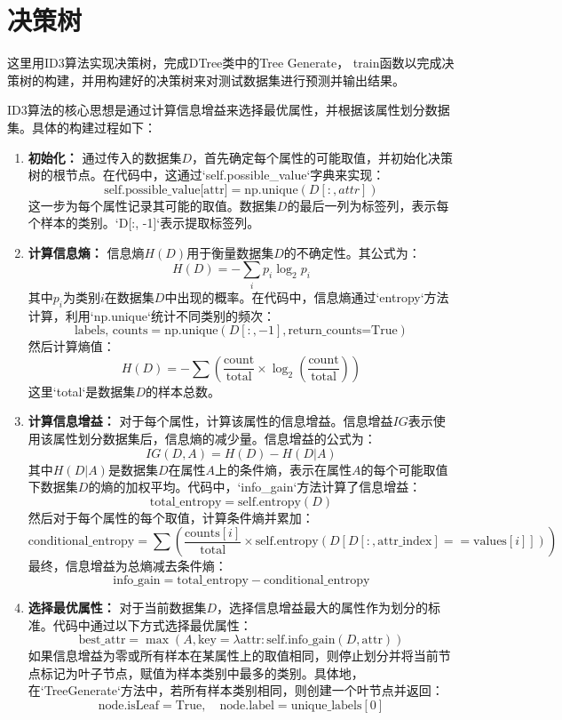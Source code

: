 \documentclass[12pt,a4paper,oneside]{article}
\begin{document}
\section{决策树}
\qquad 这里用ID3算法实现决策树，完成DTree类中的Tree Generate，
train函数以完成决策树的构建，并用构建好的决策树来对测试数据集进行预测并输出结果。



ID3算法的核心思想是通过计算信息增益来选择最优属性，并根据该属性划分数据集。具体的构建过程如下：

\begin{enumerate}
    \item \textbf{初始化：}
    通过传入的数据集$D$，首先确定每个属性的可能取值，并初始化决策树的根节点。在代码中，这通过`self.possible\_value`字典来实现：
    \[
    \text{self.possible\_value[attr]} = \text{np.unique}(D[:, attr])
    \]
    这一步为每个属性记录其可能的取值。数据集$D$的最后一列为标签列，表示每个样本的类别。`D[:, -1]`表示提取标签列。
    
    \item \textbf{计算信息熵：}
    信息熵$H(D)$用于衡量数据集$D$的不确定性。其公式为：
    \[
    H(D) = -\sum_{i} p_i \log_2 p_i
    \]
    其中$p_i$为类别$i$在数据集$D$中出现的概率。在代码中，信息熵通过`entropy`方法计算，利用`np.unique`统计不同类别的频次：
    \[
    \text{labels, counts} = \text{np.unique}(D[:, -1], \text{return\_counts=True})
    \]
    然后计算熵值：
    \[
    H(D) = -\sum \left(\frac{\text{count}}{\text{total}} \times \log_2 \left(\frac{\text{count}}{\text{total}}\right)\right)
    \]
    这里`total`是数据集$D$的样本总数。

    \item \textbf{计算信息增益：}
    对于每个属性，计算该属性的信息增益。信息增益$IG$表示使用该属性划分数据集后，信息熵的减少量。信息增益的公式为：
    \[
    IG(D, A) = H(D) - H(D|A)
    \]
    其中$H(D|A)$是数据集$D$在属性$A$上的条件熵，表示在属性$A$的每个可能取值下数据集$D$的熵的加权平均。代码中，`info\_gain`方法计算了信息增益：
    \[
    \text{total\_entropy} = \text{self.entropy}(D)
    \]
    然后对于每个属性的每个取值，计算条件熵并累加：
    \[
    \text{conditional\_entropy} = \sum \left( \frac{\text{counts}[i]}{\text{total}} \times \text{self.entropy}(D[D[:, \text{attr\_index}] == \text{values}[i]]) \right)
    \]
    最终，信息增益为总熵减去条件熵：
    \[
    \text{info\_gain} = \text{total\_entropy} - \text{conditional\_entropy}
    \]

    \item \textbf{选择最优属性：}
    对于当前数据集$D$，选择信息增益最大的属性作为划分的标准。代码中通过以下方式选择最优属性：
    \[
    \text{best\_attr} = \max(A, \text{key}=\lambda \text{attr}: \text{self.info\_gain}(D, \text{attr}))
    \]
    如果信息增益为零或所有样本在某属性上的取值相同，则停止划分并将当前节点标记为叶子节点，赋值为样本类别中最多的类别。具体地，在`TreeGenerate`方法中，若所有样本类别相同，则创建一个叶节点并返回：
    \[
    \text{node.isLeaf} = \text{True}, \quad \text{node.label} = \text{unique\_labels}[0]
    \]


\end{enumerate}
\end{document}
